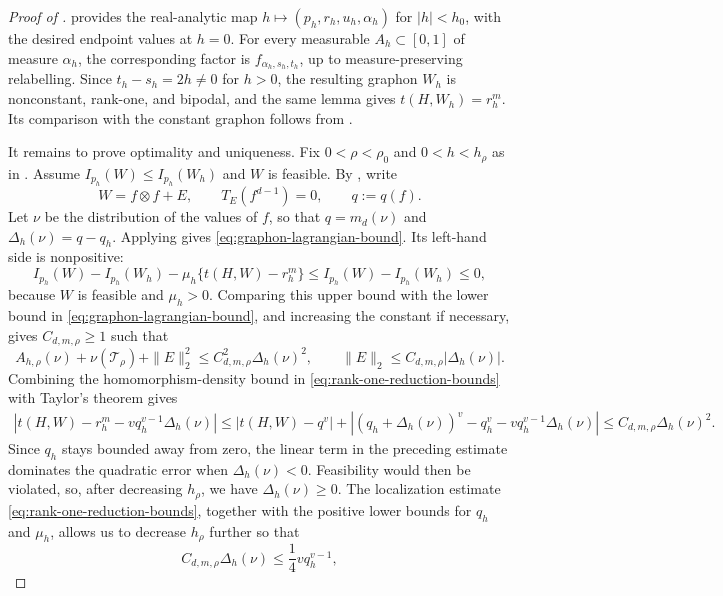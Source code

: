 \begin{proof}[Proof of ]
 provides the real-analytic map
$h\mapsto(p_h,r_h,u_h,\alpha_h)$ for $|h|<h_0$, with the desired endpoint
values at $h=0$.  For every measurable $A_h\subset[0,1]$ of measure
$\alpha_h$, the corresponding factor is $f_{\alpha_h,s_h,t_h}$, up to measure-preserving relabelling.
Since $t_h-s_h=2h\ne0$ for $h>0$, the resulting graphon $W_h$ is
nonconstant, rank-one, and bipodal, and the same lemma gives
$t(H,W_h)=r_h^m$.  Its comparison with the constant graphon follows from
.

It remains to prove optimality and uniqueness.
Fix $0<\rho<\rho_0$ and $0<h<h_\rho$ as in .
Assume $I_{p_h}(W)\le I_{p_h}(W_h)$ and $W$ is feasible.
By , write
\[
  W=f\otimes f+E,
  \qquad
  T_E(f^{d-1})=0,
  \qquad
  q:=q(f).
\]
Let $\nu$ be the distribution of the values of $f$, so that $q=m_d(\nu)$ and
$\Delta_h(\nu)=q-q_h$.  Applying  gives
\eqref{eq:graphon-lagrangian-bound}.  Its left-hand side is nonpositive:
\[
  I_{p_h}(W)-I_{p_h}(W_h)-\mu_h\{t(H,W)-r_h^m\}
  \le I_{p_h}(W)-I_{p_h}(W_h)\le0,
\]
because $W$ is feasible and $\mu_h>0$.  Comparing this upper bound with the
lower bound in \eqref{eq:graphon-lagrangian-bound}, and increasing the
constant if necessary, gives $C_{d,m,\rho}\ge1$ such that
\[
  A_{h,\rho}(\nu)+\nu(\mathcal T_\rho)+\|E\|_2^2
  \le C_{d,m,\rho}^2\Delta_h(\nu)^2,
  \qquad
  \|E\|_2\le C_{d,m,\rho}|\Delta_h(\nu)|.
\]
Combining the homomorphism-density bound in
\eqref{eq:rank-one-reduction-bounds} with Taylor's theorem gives
\begin{equation*}
\begin{aligned}
  \left|t(H,W)-r_h^m-vq_h^{v-1}\Delta_h(\nu)\right|
  \le 
  |t(H,W)-q^v|
    +\left|(q_h+\Delta_h(\nu))^v-q_h^v
      -vq_h^{v-1}\Delta_h(\nu)\right|
  \le C_{d,m,\rho}\Delta_h(\nu)^2.
\end{aligned}
\end{equation*}
Since $q_h$ stays bounded away from zero, the linear term in the preceding
estimate dominates the quadratic error when $\Delta_h(\nu)<0$.  Feasibility
would then be violated, so, after decreasing $h_\rho$, we have
$\Delta_h(\nu)\ge0$.  The localization estimate
\eqref{eq:rank-one-reduction-bounds}, together with the positive lower
bounds for $q_h$ and $\mu_h$, allows us to decrease $h_\rho$ further so that
\[
  C_{d,m,\rho}\Delta_h(\nu)\le\frac14vq_h^{v-1},
\]
\end{proof}
